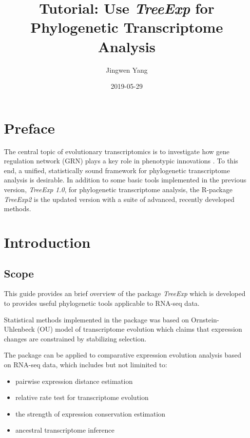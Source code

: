 \documentclass[]{book}
\title{Tutorial: Use \emph{TreeExp} for Phylogenetic Transcriptome Analysis}
\author{Jingwen Yang}
\date{2019-05-29}
\providecommand{\tightlist}{%
  \setlength{\itemsep}{0pt}\setlength{\parskip}{0pt}}
\begin{document}
\maketitle

{
\setcounter{tocdepth}{1}
\tableofcontents
}
\hypertarget{preface}{%
\chapter{Preface}\label{preface}}

The central topic of evolutionary transcriptomics is to investigate how gene regulation network (GRN) plays a key role in phenotypic innovations \citep[\citet{harrison2012}\citet{lehner2013}]{king1975}. To this end, a unified, statistically sound framework for phylogenetic transcriptome analysis is desirable. In addition to some basic tools implemented in the previous version, \emph{TreeExp 1.0}\citep{doi:10.1002/jez.b.22707}, for phylogenetic transcriptome analysis, the R-package \emph{TreeExp2} is the updated version with a suite of advanced, recently developed methods.

\hypertarget{introduction}{%
\chapter{Introduction}\label{introduction}}

\hypertarget{scope}{%
\section{Scope}\label{scope}}

This guide provides an brief overview of the package \emph{TreeExp} which is developed to provides useful phylogenetic tools applicable to RNA-seq data.

Statistical methods implemented in the package was based on Ornstein-Uhlenbeck (OU) model of transcriptome evolution which claims that expression changes are constrained by stabilizing selection.

The package can be applied to comparative expression evolution analysis based on RNA-seq data, which includes but not liminited to:

\begin{itemize}
\tightlist
\item
  pairwise expression distance estimation
\item
  relative rate test for transcriptome evolution
\item
  the strength of expression conservation estimation
\item
  ancestral transcriptome inference
\end{itemize}
\end{document}
